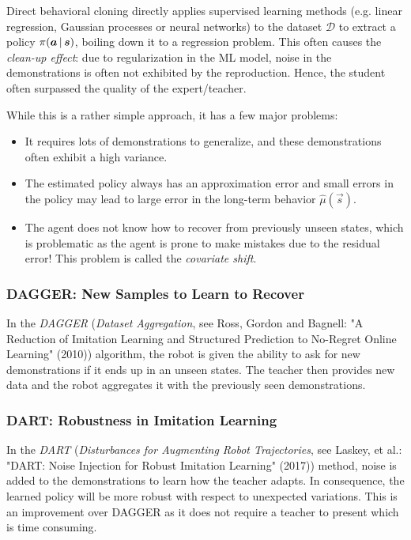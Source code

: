 			Direct behavioral cloning directly applies supervised learning methods (e.g. linear regression, Gaussian processes or neural networks) to the dataset \(\mathcal{D}\) to extract a policy \( \pi(\bm{a} \,\vert\, \bm{s}) \), boiling down it to a regression problem. This often causes the \emph{clean-up effect}: due to regularization in the ML model, noise in the demonstrations is often not exhibited by the reproduction. Hence, the student often surpassed the quality of the expert/teacher.

			While this is a rather simple approach, it has a few major problems:
			\begin{itemize}
				\item It requires lots of demonstrations to generalize, and these demonstrations often exhibit a high variance.
				\item The estimated policy always has an approximation error and small errors in the policy may lead to large error in the long-term behavior \( \hat{\mu}(\vec{s}) \).
				\item The agent does not know how to recover from previously unseen states, which is problematic as the agent is prone to make mistakes due to the residual error! This problem is called the \emph{covariate shift}.
			\end{itemize}

			\subsubsection{DAGGER: New Samples to Learn to Recover}
				In the \emph{DAGGER} (\emph{Dataset Aggregation}, see Ross, Gordon and Bagnell: "A Reduction of Imitation Learning and Structured Prediction to No-Regret Online Learning" (2010)) algorithm, the robot is given the ability to ask for new demonstrations if it ends up in an unseen states. The teacher then provides new data and the robot aggregates it with the previously seen demonstrations.

			\subsubsection{DART: Robustness in Imitation Learning}
				In the \emph{DART} (\emph{Disturbances for Augmenting Robot Trajectories}, see Laskey, et al.: "DART: Noise Injection for Robust Imitation Learning" (2017)) method, noise is added to the demonstrations to learn how the teacher adapts. In consequence, the learned policy will be more robust with respect to unexpected variations. This is an improvement over DAGGER as it does not require a teacher to present which is time consuming.

